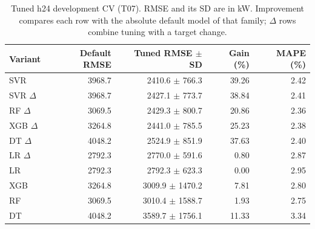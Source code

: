 \begin{table}[H]\centering\small
\caption{Tuned h24 development CV (T07). RMSE and its SD are in kW. Improvement compares each row with the absolute default model of that family; $\Delta$ rows combine tuning with a target change.}\label{tab:tuning}
\setlength{\tabcolsep}{4pt}
\begin{tabular}{lrrrr}
\toprule
Variant & Default RMSE & Tuned RMSE $\pm$ SD & Gain (\%) & MAPE (\%) \\
\midrule
SVR & \num{3968.7} & \num{2410.6} $\pm$ \num{766.3} & \num{39.26} & \num{2.42} \\
SVR $\Delta$ & \num{3968.7} & \num{2427.1} $\pm$ \num{773.7} & \num{38.84} & \num{2.41} \\
RF $\Delta$ & \num{3069.5} & \num{2429.3} $\pm$ \num{800.7} & \num{20.86} & \num{2.36} \\
XGB $\Delta$ & \num{3264.8} & \num{2441.0} $\pm$ \num{785.5} & \num{25.23} & \num{2.38} \\
DT $\Delta$ & \num{4048.2} & \num{2524.9} $\pm$ \num{851.9} & \num{37.63} & \num{2.40} \\
LR $\Delta$ & \num{2792.3} & \num{2770.0} $\pm$ \num{591.6} & \num{0.80} & \num{2.87} \\
LR & \num{2792.3} & \num{2792.3} $\pm$ \num{623.3} & \num{0.00} & \num{2.95} \\
XGB & \num{3264.8} & \num{3009.9} $\pm$ \num{1470.2} & \num{7.81} & \num{2.80} \\
RF & \num{3069.5} & \num{3010.4} $\pm$ \num{1588.7} & \num{1.93} & \num{2.75} \\
DT & \num{4048.2} & \num{3589.7} $\pm$ \num{1756.1} & \num{11.33} & \num{3.34} \\
\bottomrule\end{tabular}
\end{table}
